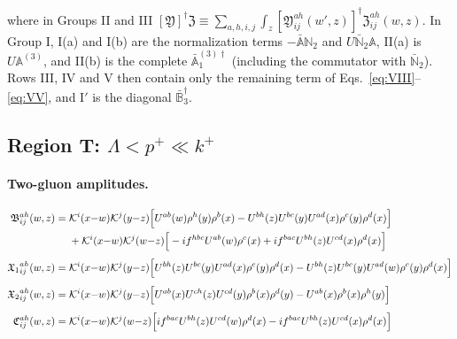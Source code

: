 \documentclass[aps,prd,onecolumn,superscriptaddress,nofootinbib,floatfix,longbibliography,11pt]{revtex4-2}
\numberwithin{equation}{section}
\newcommand{\KK}{\mathcal{K}}
\def\mf#1{\mathbb{#1}}
\begin{document}
where in Groups II and III $[\mathfrak Y]^\dagger\mathfrak Z\equiv\sum_{a,h,i,j}\int_z[\mathfrak Y^{ah}_{ij}(w',z)]^\dagger\mathfrak Z^{ah}_{ij}(w,z)$. In Group I, I(a) and I(b) are the normalization terms $-\bar{\mf A}\mf N_2$ and $U\bar{\mf N}_2\mf A$, II(a) is $U\mf A^{(3)}$, and II(b) is the complete $\bar{\mf A}^{(3)\dagger}_1$ (including the commutator with $\bar{\mf N}_2$). Rows III, IV and V then contain only the remaining term of Eqs.~\eqref{eq:VIII}--\eqref{eq:VV}, and I$'$ is the diagonal $\bar{\mf B}_3^\dagger$.

\subsection{Region T: \texorpdfstring{$\Lambda<p^+\ll k^+$}{Lambda<p+<<k+}}
\paragraph*{Two-gluon amplitudes.}
{\small
\begin{align}
\mathfrak B^{ah}_{ij}(w,z)=\;&\KK^{i}(x{-}w)\KK^{j}(y{-}z)\Big[U^{ab}(w)\rho^{h}(y)\rho^{b}(x)-U^{bh}(z)U^{bc}(y)U^{ad}(x)\rho^{c}(y)\rho^{d}(x)\Big]\notag\\
&+\KK^{i}(x{-}w)\KK^{j}(w{-}z)\Big[-if^{hbc}U^{ab}(w)\rho^{c}(x)+if^{bac}U^{bh}(z)U^{cd}(x)\rho^{d}(x)\Big]\label{eq:LLT2TB}
\\[4pt]
{\mathfrak X_1}^{ah}_{ij}(w,z)=\;&\KK^{i}(x{-}w)\KK^{j}(y{-}z)\Big[U^{bh}(z)U^{bc}(y)U^{ad}(x)\rho^{c}(y)\rho^{d}(x)-U^{bh}(z)U^{bc}(y)U^{ad}(w)\rho^{c}(y)\rho^{d}(x)\Big]\label{eq:LLT2TX1}
\\[4pt]
{\mathfrak X_2}^{ah}_{ij}(w,z)=\;&\KK^{i}(x{-}w)\KK^{j}(y{-}z)\Big[U^{ab}(x)U^{ch}(z)U^{cd}(y)\rho^{b}(x)\rho^{d}(y)-U^{ab}(x)\rho^{b}(x)\rho^{h}(y)\Big]\label{eq:LLT2TX2}
\\[4pt]
\mathfrak C^{ah}_{ij}(w,z)=\;&\KK^{i}(x{-}w)\KK^{j}(w{-}z)\Big[if^{bac}U^{bh}(z)U^{cd}(w)\rho^{d}(x)-if^{bac}U^{bh}(z)U^{cd}(x)\rho^{d}(x)\Big]\label{eq:LLT2TC}
\end{align}
}
\end{document}
